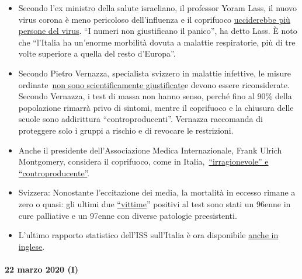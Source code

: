 \begin{itemize}
\tightlist
\item
  Secondo l'ex ministro della salute israeliano, il professor Yoram
  Lass, il nuovo virus corona è meno pericoloso dell'influenza e il
  coprifuoco
  \href{https://en.globes.co.il/en/article-lockdown-lunacy-1001322696}{ucciderebbe
  più persone del virus}. ``I numeri non giustificano il panico'', ha
  detto Lass. È noto che ``l'Italia ha un'enorme morbilità dovuta a
  malattie respiratorie, più di tre volte superiore a quella del resto
  d'Europa''.
\item
  Secondo Pietro Vernazza, specialista svizzero in malattie infettive,
  le misure
  ordinate~\href{https://www.tagblatt.ch/leben/ostschweizer-infektiologe-pietro-vernazza-die-zahlen-zu-den-jungen-corona-virus-erkrankten-sind-irrefuehrend-ld.1206440}{non
  sono scientificamente giustificate}e devono essere riconsiderate.
  Secondo Vernazza, i test di massa non hanno senso, perché fino al 90\%
  della popolazione rimarrà privo di sintomi, mentre il coprifuoco e la
  chiusura delle scuole sono addirittura ``controproducenti''. Vernazza
  raccomanda di proteggere solo i gruppi a rischio e di revocare le
  restrizioni.
\item
  Anche il presidente dell'Associazione Medica Internazionale, Frank
  Ulrich Montgomery, considera il coprifuoco, come in
  Italia,~\href{https://www.general-anzeiger-bonn.de/news/politik/deutschland/interview-mit-weltaerztepraesident-montgomery-ueber-corona-pandemie-ist-chaos_aid-49609561}{``irragionevole''
  e ``controproducente''}.
\item
  Svizzera: Nonostante l'eccitazione dei media, la mortalità in eccesso
  rimane a zero o quasi: gli ultimi due
  \href{https://www.bluewin.ch/de/newsregional/zuerich/1068-bestatigte-corona-falle-und-funf-todesfalle-im-kanton-zurich-371873.html}{``vittime}''
  positivi al test sono stati un 96enne in cure palliative e un 97enne
  con diverse patologie preesistenti.
\item
  L'ultimo rapporto statistico dell'ISS sull'Italia è ora disponibile
  \href{https://www.epicentro.iss.it/coronavirus/bollettino/Report-COVID-2019_20_marzo_eng.pdf}{anche
  in inglese}.
\end{itemize}

\hypertarget{22-marzo-2020-i}{%
\paragraph{22 marzo 2020 (I)}\label{22-marzo-2020-i}}

